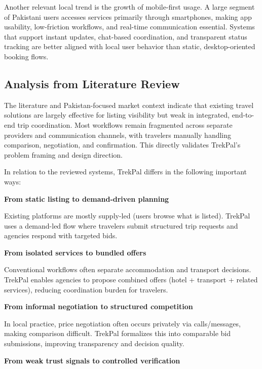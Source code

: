 \documentclass[12pt,a4paper]{article}
\newlength{\ThesisParagraphIndent}
\newcommand{\ThesisParagraph}[1]{%
  \par\begingroup
  \setlength{\leftskip}{\ThesisParagraphIndent}%
  \setlength{\parindent}{0pt}%
  \noindent#1\par
  \endgroup}
\begin{document}
\ThesisParagraph{Another relevant local trend is the growth of mobile-first usage. A large segment of Pakistani users accesses services primarily through smartphones, making app usability, low-friction workflows, and real-time communication essential. Systems that support instant updates, chat-based coordination, and transparent status tracking are better aligned with local user behavior than static, desktop-oriented booking flows.}


\subsection{Analysis from Literature Review}

\ThesisParagraph{The literature and Pakistan-focused market context indicate that existing travel solutions are largely effective for listing visibility but weak in integrated, end-to-end trip coordination. Most workflows remain fragmented across separate providers and communication channels, with travelers manually handling comparison, negotiation, and confirmation. This directly validates TrekPal's problem framing and design direction.}


\ThesisParagraph{In relation to the reviewed systems, TrekPal differs in the following important ways:}


\ThesisParagraph{\textbf{From static listing to demand-driven planning}}


\ThesisParagraph{Existing platforms are mostly supply-led (users browse what is listed). TrekPal uses a demand-led flow where travelers submit structured trip requests and agencies respond with targeted bids.}


\ThesisParagraph{\textbf{From isolated services to bundled offers}}


\ThesisParagraph{Conventional workflows often separate accommodation and transport decisions. TrekPal enables agencies to propose combined offers (hotel + transport + related services), reducing coordination burden for travelers.}


\ThesisParagraph{\textbf{From informal negotiation to structured competition}}


\ThesisParagraph{In local practice, price negotiation often occurs privately via calls/messages, making comparison difficult. TrekPal formalizes this into comparable bid submissions, improving transparency and decision quality.}


\ThesisParagraph{\textbf{From weak trust signals to controlled verification}}
\end{document}
